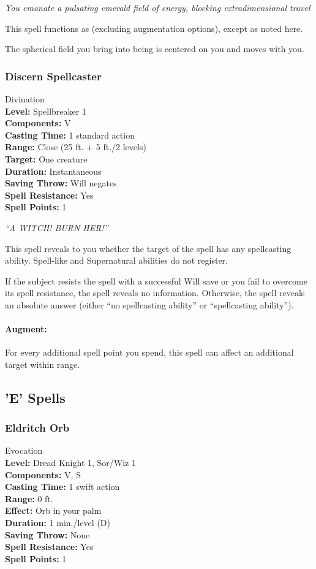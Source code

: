 \emph{You emanate a pulsating emerald field of energy, blocking extradimensional travel }

This spell functions as  (excluding augmentation options), except as noted here.

The spherical field you bring into being is centered on you and moves with you.
\subsubsection{Discern Spellcaster}
\label{Spell:DiscernSpellcaster}
Divination
\\ \textbf{Level:} Spellbreaker 1
\\ \textbf{Components:} V
\\ \textbf{Casting Time:} 1 standard action
\\ \textbf{Range:} Close (25 ft. + 5 ft./2 levels)
\\ \textbf{Target:} One creature
\\ \textbf{Duration:} Instantaneous
\\ \textbf{Saving Throw:} Will negates
\\ \textbf{Spell Resistance:} Yes
\\ \textbf{Spell Points:} 1

\emph{``A WITCH! BURN HER!''}

This spell reveals to you whether the target of the spell has any spellcasting ability. Spell-like and Supernatural abilities do not register.

If the subject resists the spell with a successful Will save or you fail to overcome its spell resistance, the spell reveals no information. Otherwise, the spell reveals an absolute answer (either ``no spellcasting ability'' or ``spellcasting ability'').

\paragraph{Augment:} For every additional spell point you spend, this spell can affect an additional target within range.

\subsection{'E' Spells}

\subsubsection{Eldritch Orb}
\label{Spell:EldritchOrb}
Evocation
\\ \textbf{Level:} Dread Knight 1, Sor/Wiz 1
\\ \textbf{Components:} V, S
\\ \textbf{Casting Time:} 1 swift action
\\ \textbf{Range:} 0 ft.
\\ \textbf{Effect:} Orb in your palm
\\ \textbf{Duration:} 1 min./level (D)
\\ \textbf{Saving Throw:} None
\\ \textbf{Spell Resistance:} Yes
\\ \textbf{Spell Points:} 1

